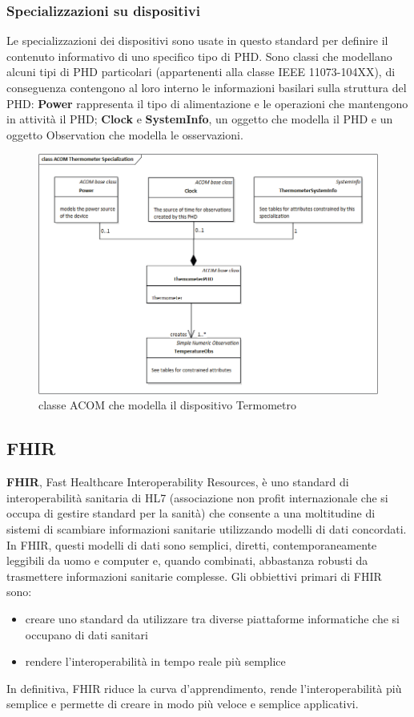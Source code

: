 \documentclass[a4paper]{article}
\begin{document}
\subsubsection{Specializzazioni su dispositivi}
Le specializzazioni dei dispositivi sono usate in questo standard per definire il contenuto informativo di uno specifico tipo di PHD.
Sono classi che modellano alcuni tipi di PHD particolari (appartenenti alla classe IEEE 11073-104XX), di conseguenza contengono al loro interno le informazioni basilari sulla struttura del PHD: \textbf{Power} rappresenta il tipo di alimentazione e le operazioni che mantengono in attività il PHD; \textbf{Clock}  e \textbf{SystemInfo},
un oggetto che modella il PHD e un oggetto Observation che modella le osservazioni.


\begin{figure}[H]
    \centering
    \includegraphics[width=1\textwidth]{figures/ACOM thermometer specialization class.png}
    \caption{classe ACOM che modella il dispositivo Termometro}
\end{figure}

\subsection{FHIR}
\textbf{FHIR}, Fast Healthcare Interoperability Resources, è uno standard di interoperabilità sanitaria di HL7 (associazione non profit internazionale che si occupa di gestire standard per la sanità)
che consente a una moltitudine di sistemi di scambiare informazioni sanitarie utilizzando modelli di dati concordati. In FHIR, questi modelli di dati sono semplici, diretti, contemporaneamente
leggibili da uomo e computer e, quando combinati, abbastanza robusti da trasmettere informazioni sanitarie complesse.
Gli obbiettivi primari di FHIR sono:
\begin{itemize}
    \item creare uno standard da utilizzare tra diverse piattaforme informatiche che si occupano di dati sanitari
    \item rendere l'interoperabilità in tempo reale più semplice
\end{itemize}
In definitiva, FHIR riduce la curva d'apprendimento, rende l'interoperabilità più semplice e permette di creare in modo più veloce e semplice applicativi.
\end{document}
